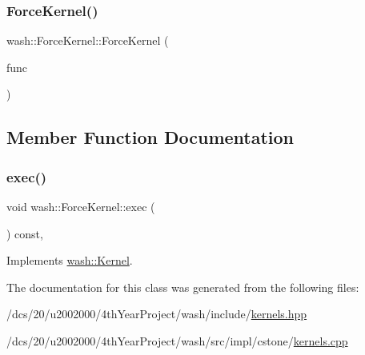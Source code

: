 \subsubsection{\texorpdfstring{Force\+Kernel()}{ForceKernel()}}
{\footnotesize\ttfamily wash\+::\+Force\+Kernel\+::\+Force\+Kernel (\begin{DoxyParamCaption}\item[{const \mbox{\hyperlink{namespacewash_a3687ea698f8cb8c077d728e5d74de495}{Force\+FuncT}}}]{func }\end{DoxyParamCaption})\hspace{0.3cm}{\ttfamily [inline]}}



\subsection{Member Function Documentation}
\mbox{\label{classwash_1_1ForceKernel_aa815514d4e9af5ebb056dbe8f1d5a720}} 
\subsubsection{\texorpdfstring{exec()}{exec()}}
{\footnotesize\ttfamily void wash\+::\+Force\+Kernel\+::exec (\begin{DoxyParamCaption}{ }\end{DoxyParamCaption}) const\hspace{0.3cm}{\ttfamily [override]}, {\ttfamily [virtual]}}



Implements \mbox{\hyperlink{classwash_1_1Kernel_a0ec211840402ce975997b22136f16e39}{wash\+::\+Kernel}}.



The documentation for this class was generated from the following files\+:\begin{DoxyCompactItemize}
\item 
/dcs/20/u2002000/4th\+Year\+Project/wash/include/\mbox{\hyperlink{kernels_8hpp}{kernels.\+hpp}}\item 
/dcs/20/u2002000/4th\+Year\+Project/wash/src/impl/cstone/\mbox{\hyperlink{cstone_2kernels_8cpp}{kernels.\+cpp}}\end{DoxyCompactItemize}
